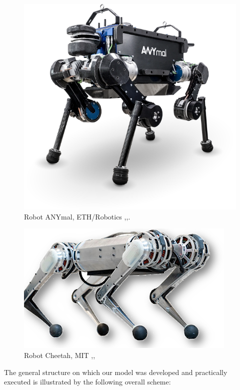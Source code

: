 \documentclass[Afour,sageh,times]{sagej}
\begin{document}
\begin{figure}
    \centering
    \includegraphics[scale=0.4]{ANYmal-Bedi-1030x999.png}
    \caption{Robot ANYmal, ETH/Robotics \citep{Cully2015},\citep{Hwangbo2019},\citep{Yahya2017}.}
    \label{fig:RobotANYmal}
\end{figure}
\begin{figure}
    \centering
    \includegraphics[scale=1.2]{mit-cheetah.png}
    \caption{Robot Cheetah, MIT \citep{Seok2013},\citep{DiCarlo2018},\citep{Li2014}}
    \label{fig:RobotCheetah}
\end{figure}
The general structure on which our model was developed and practically executed is illustrated by the following overall scheme:
\end{document}
